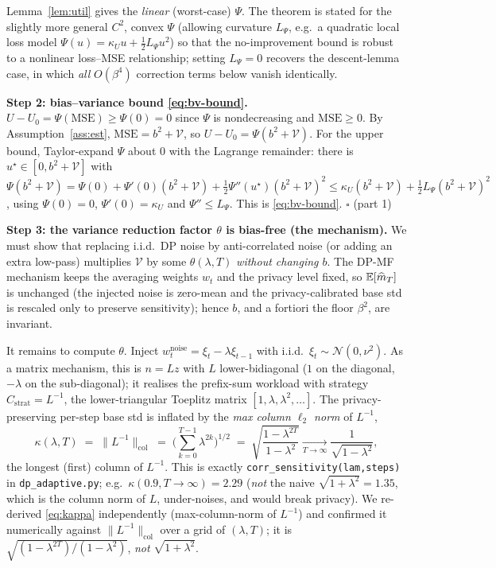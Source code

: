 Lemma~\ref{lem:util} gives the \emph{linear} (worst-case) $\Psi$. The theorem is stated for the
slightly more general $C^2$, convex $\Psi$ (allowing curvature $L_\Psi$, e.g.\ a quadratic local
loss model $\Psi(u)=\kappa_U u+\tfrac12 L_\Psi u^2$) so that the no-improvement bound is robust to a
nonlinear loss--MSE relationship; setting $L_\Psi=0$ recovers the descent-lemma case, in which
\emph{all} $O(\beta^4)$ correction terms below vanish identically.

\par\smallskip\noindent\textbf{Step 2: bias--variance bound \eqref{eq:bv-bound}.}\quad 
$U-U_0=\Psi(\mathrm{MSE})\ge\Psi(0)=0$ since $\Psi$ is nondecreasing and $\mathrm{MSE}\ge0$.
By Assumption~\ref{ass:est}, $\mathrm{MSE}=b^2+\mathcal V$, so $U-U_0=\Psi(b^2+\mathcal V)$. For the
upper bound, Taylor-expand $\Psi$ about $0$ with the Lagrange remainder: there is
$u^\star\in[0,b^2+\mathcal V]$ with
$\Psi(b^2+\mathcal V)=\Psi(0)+\Psi'(0)(b^2+\mathcal V)+\tfrac12\Psi''(u^\star)(b^2+\mathcal V)^2
\le\kappa_U(b^2+\mathcal V)+\tfrac12 L_\Psi(b^2+\mathcal V)^2$, using $\Psi(0)=0$, $\Psi'(0)=\kappa_U$
and $\Psi''\le L_\Psi$. This is \eqref{eq:bv-bound}. \hfill$\square$ (part 1)

\par\smallskip\noindent\textbf{Step 3: the variance reduction factor $\theta$ is bias-free (the mechanism).}\quad 
We must show that replacing i.i.d.\ DP noise by anti-correlated noise (or adding an extra low-pass)
multiplies $\mathcal V$ by some $\theta(\lambda,T)$ \emph{without changing $b$}. The DP-MF mechanism
keeps the averaging weights $w_t$ and the privacy level fixed, so $\mathbb{E}[\widehat m_T]$ is unchanged
(the injected noise is zero-mean and the privacy-calibrated base std is rescaled only to preserve
sensitivity); hence $b$, and a fortiori the floor $\beta^2$, are invariant.

It remains to compute $\theta$. Inject $w_t^{\mathrm{noise}}=\xi_t-\lambda\xi_{t-1}$ with i.i.d.\
$\xi_t\sim\mathcal N(0,\nu^2)$. As a matrix mechanism, this is $n=Lz$ with $L$ lower-bidiagonal
($1$ on the diagonal, $-\lambda$ on the sub-diagonal); it realises the prefix-sum workload with
strategy $C_{\mathrm{strat}}=L^{-1}$, the lower-triangular Toeplitz matrix
$[1,\lambda,\lambda^2,\dots]$. The privacy-preserving per-step base std is inflated by the
\emph{max column $\ell_2$ norm} of $L^{-1}$,
\begin{equation}
\label{eq:kappa}
\kappa(\lambda,T)\;=\;\big\|L^{-1}\big\|_{\mathrm{col}}\;=\;\Big(\sum_{k=0}^{T-1}\lambda^{2k}\Big)^{1/2}\;=\;\sqrt{\frac{1-\lambda^{2T}}{1-\lambda^2}}\xrightarrow[T\to\infty]{}\frac{1}{\sqrt{1-\lambda^2}},
\end{equation}
the longest (first) column of $L^{-1}$. This is exactly \texttt{corr\_sensitivity(lam,steps)} in
\texttt{dp\_adaptive.py}; e.g.\ $\kappa(0.9,T{\to}\infty)=2.29$ (\emph{not} the naive $\sqrt{1+\lambda^2}=1.35$,
which is the column norm of $L$, under-noises, and would break privacy). We re-derived
\eqref{eq:kappa} independently (max-column-norm of $L^{-1}$) and confirmed it numerically against
$\|L^{-1}\|_{\mathrm{col}}$ over a grid of $(\lambda,T)$; it is $\sqrt{(1-\lambda^{2T})/(1-\lambda^2)}$,
\emph{not} $\sqrt{1+\lambda^2}$.

